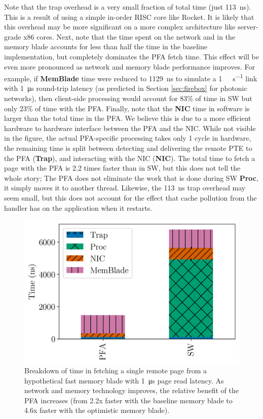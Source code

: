   Note that the trap overhead is a very small fraction of total time (just
  \SI{113}{\nano\second}). This is a result of using a simple in-order RISC
  core like Rocket. It is likely that this overhead may be more significant on
  a more complex architecture like server-grade x86 cores. Next, note that the
  time spent on the network and in the memory blade accounts for less than half
  the time in the baseline implementation, but completely dominates the PFA
  fetch time. This effect will be even more pronounced as network and memory
  blade performance improves. For example, if \textbf{MemBlade} time were
  reduced to \SI{1129}{\nano\second} to simulate a \SI{1}{\tera\bit\per\second}
  link with \SI{1}{\micro\second} round-trip latency (as predicted in Section
  \ref{sec:firebox} for photonic networks), then client-side processing would
  account for 83\% of time in SW but only 23\% of time with the PFA. Finally,
  note that the \textbf{NIC} time in software is larger than the total time in
  the PFA. We believe this is due to a more efficient hardware to hardware
  interface between the PFA and the NIC. While not visible in the figure, the
  actual PFA-specific processing takes only 1 cycle in hardware, the remaining
  time is split between detecting and delivering the remote PTE to the PFA
  (\textbf{Trap}), and interacting with the NIC (\textbf{NIC}). The total time
  to fetch a page with the PFA is 2.2 times faster than in SW, but this does
  not tell the whole story; The PFA does not eliminate the work that is done
  during SW \textbf{Proc}, it simply moves it to another thread. Likewise, the
  \SI{113}{\nano\second} trap overhead may seem small, but this does not
  account for the effect that cache pollution from the handler has on the
  application when it restarts.

  \begin{figure}[h] \centering
    \includegraphics[width=0.8\columnwidth]{figs/fetch_breakdown_fastmem.png}
    \caption{Breakdown of time in fetching a single remote page from a
      hypothetical fast memory blade with \SI{1}{\micro\second} page read
      latency. As network and memory technology improves, the relative benefit
      of the PFA increases (from 2.2x faster with the baseline memory blade to
      4.6x faster with the optimistic memory blade).}
    \label{fig:fetch_breakdown}
  \end{figure}

